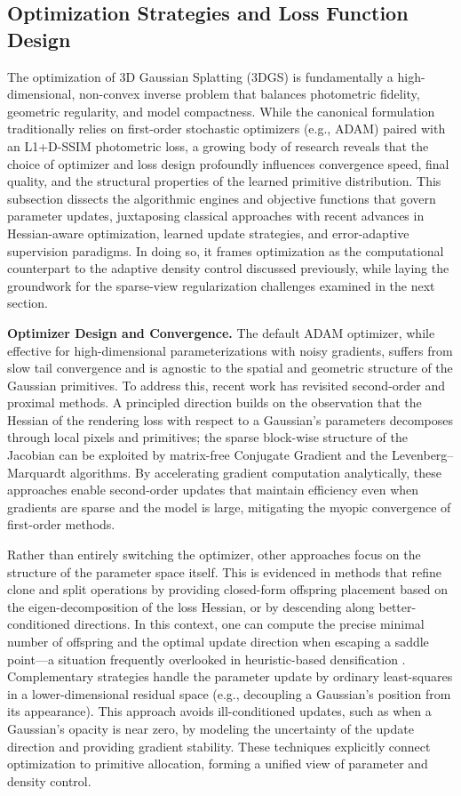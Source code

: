\documentclass[11pt,a4paper]{article}
\begin{document}
\subsection{Optimization Strategies and Loss Function Design}


The optimization of 3D Gaussian Splatting (3DGS) is fundamentally a high-dimensional, non-convex inverse problem that balances photometric fidelity, geometric regularity, and model compactness. While the canonical formulation traditionally relies on first-order stochastic optimizers (e.g., ADAM) paired with an L1+D-SSIM photometric loss, a growing body of research reveals that the choice of optimizer and loss design profoundly influences convergence speed, final quality, and the structural properties of the learned primitive distribution. This subsection dissects the algorithmic engines and objective functions that govern parameter updates, juxtaposing classical approaches with recent advances in Hessian-aware optimization, learned update strategies, and error-adaptive supervision paradigms. In doing so, it frames optimization as the computational counterpart to the adaptive density control discussed previously, while laying the groundwork for the sparse-view regularization challenges examined in the next section.

\textbf{Optimizer Design and Convergence.} The default ADAM optimizer, while effective for high-dimensional parameterizations with noisy gradients, suffers from slow tail convergence and is agnostic to the spatial and geometric structure of the Gaussian primitives. To address this, recent work has revisited second-order and proximal methods. A principled direction builds on the observation that the Hessian of the rendering loss with respect to a Gaussian's parameters decomposes through local pixels and primitives; the sparse block-wise structure of the Jacobian can be exploited by matrix-free Conjugate Gradient and the Levenberg--Marquardt algorithms. By accelerating gradient computation analytically, these approaches enable second-order updates that maintain efficiency even when gradients are sparse and the model is large, mitigating the myopic convergence of first-order methods.

Rather than entirely switching the optimizer, other approaches focus on the structure of the parameter space itself. This is evidenced in methods that refine clone and split operations by providing closed-form offspring placement based on the eigen-decomposition of the loss Hessian, or by descending along better-conditioned directions. In this context, one can compute the precise minimal number of offspring and the optimal update direction when escaping a saddle point---a situation frequently overlooked in heuristic-based densification \cite{arxiv:2505.05587v1}. Complementary strategies handle the parameter update by ordinary least-squares in a lower-dimensional residual space (e.g., decoupling a Gaussian's position from its appearance). This approach avoids ill-conditioned updates, such as when a Gaussian's opacity is near zero, by modeling the uncertainty of the update direction and providing gradient stability. These techniques explicitly connect optimization to primitive allocation, forming a unified view of parameter and density control.
\end{document}
